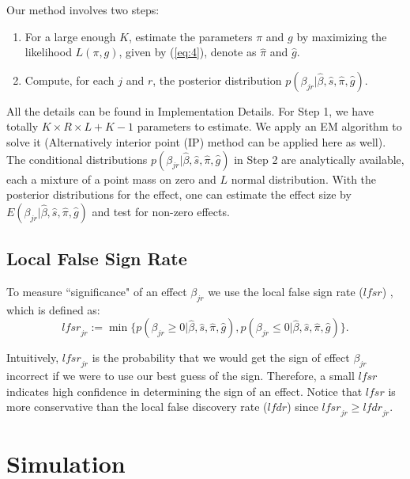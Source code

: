 \documentclass[12pt]{article}
\def\lfdr{\textit{lfdr}}
\def\lfsr{\textit{lfsr}}
\begin{document}
\vspace{4mm} Our method involves two steps:
\begin{enumerate}
    \item For a large enough $K$, estimate the parameters $\pi$ and $g$ by maximizing the likelihood $L(\pi,g)$, given by (\ref{eq:4}), denote as $\hat\pi$ and $\hat g$.
    \item Compute, for each $j$ and $r$, the posterior distribution $p(\beta_{jr}|\hat\beta,\hat s,\hat\pi,\hat g)$. 
\end{enumerate}
All the details can be found in Implementation Details. For Step 1, we  have totally $K\times R\times L+K-1$ parameters to estimate. We apply an EM algorithm to solve it (Alternatively interior point (IP) method \cite{Koenker2014} can be applied here as well). The conditional distributions $p(\beta_{jr}|\hat\beta,\hat s,\hat\pi,\hat g)$ in Step 2 are analytically available, each a mixture of a point mass on zero and $L$ normal distribution. With the posterior distributions for the effect, one can estimate the effect size by $E(\beta_{jr}|\hat\beta,\hat s,\hat\pi,\hat g)$ and test for non-zero effects. 

\vspace{5mm}
\subsection{Local False Sign Rate}

\vspace{4mm} To measure ``significance" of an effect $\beta_{jr}$ we use the local false sign rate ($\lfsr$) \cite{Stephens2017}, which is defined as:
\begin{equation}
    \lfsr_{jr} := \min\{p(\beta_{jr}\geq 0|\hat\beta,\hat s,\hat\pi,\hat g), p(\beta_{jr}\leq 0|\hat\beta,\hat s,\hat\pi,\hat g)\}.
\label{eq:lfsr}
\end{equation}

\vspace{4mm}\noindent Intuitively, $\lfsr_{jr}$ is the probability that we would get the sign of effect $\beta_{jr}$ incorrect if we were to use our best guess of the sign. Therefore, a small $\lfsr$ indicates high confidence in determining the sign of an effect. Notice that $\lfsr$ is more conservative than the local false discovery rate ($\lfdr$) since $\lfsr_{jr}\geq\lfdr_{jr}$. 

\newpage
\section{Simulation} 
\end{document}
